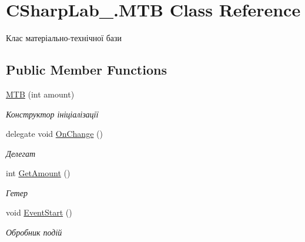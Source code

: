 \hypertarget{class_c_sharp_lab__1_1_1_m_t_b}{}\section{C\+Sharp\+Lab\+\_.\+M\+TB Class Reference}
\label{class_c_sharp_lab__1_1_1_m_t_b}


Клас матеріально-\/технічної бази  


\subsection*{Public Member Functions}
\begin{DoxyCompactItemize}
\item 
\hyperlink{class_c_sharp_lab__1_1_1_m_t_b_a795c8d94ca1b20c77870728ae387d302}{M\+TB} (int amount)
\begin{DoxyCompactList}\small\item\em Конструктор ініціалізації \end{DoxyCompactList}\item 
delegate void \hyperlink{class_c_sharp_lab__1_1_1_m_t_b_af571bf7359805b314bd1535dede971e2}{On\+Change} ()
\begin{DoxyCompactList}\small\item\em Делегат \end{DoxyCompactList}\item 
int \hyperlink{class_c_sharp_lab__1_1_1_m_t_b_a0a6eccaa6ad4e983c7f3fa47d6b926a9}{Get\+Amount} ()
\begin{DoxyCompactList}\small\item\em Гетер \end{DoxyCompactList}\item 
void \hyperlink{class_c_sharp_lab__1_1_1_m_t_b_adabad767120ebeffbeba7beef05263ce}{Event\+Start} ()
\begin{DoxyCompactList}\small\item\em Обробник подій \end{DoxyCompactList}\end{DoxyCompactItemize}
